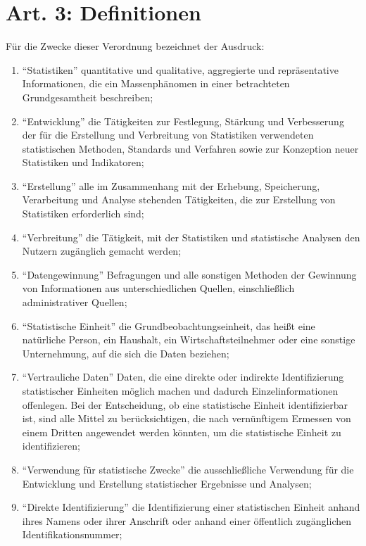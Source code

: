 \documentclass[12pt]{scrbook}
\begin{document}
    \section{Art. 3: Definitionen}
        Für die Zwecke dieser Verordnung bezeichnet der Ausdruck:
        \begin{enumerate}
            \item ``Statistiken'' quantitative und qualitative, aggregierte und repräsentative Informationen, die ein Massenphänomen in einer betrachteten Grundgesamtheit beschreiben;
            \item ``Entwicklung'' die Tätigkeiten zur Festlegung, Stärkung und Verbesserung der für die Erstellung und Verbreitung von Statistiken verwendeten statistischen Methoden, Standards und Verfahren sowie zur Konzeption neuer Statistiken und Indikatoren;
            \item ``Erstellung'' alle im Zusammenhang mit der Erhebung, Speicherung, Verarbeitung und Analyse stehenden Tätigkeiten, die zur Erstellung von Statistiken erforderlich sind;
            \item ``Verbreitung'' die Tätigkeit, mit der Statistiken und statistische Analysen den Nutzern zugänglich gemacht werden;
            \item ``Datengewinnung'' Befragungen und alle sonstigen Methoden der Gewinnung von Informationen aus unterschiedlichen Quellen, einschließlich administrativer Quellen;
            \item ``Statistische Einheit'' die Grundbeobachtungseinheit, das heißt eine natürliche Person, ein Haushalt, ein Wirtschaftsteilnehmer oder eine sonstige Unternehmung, auf die sich die Daten beziehen;
            \item ``Vertrauliche Daten'' Daten, die eine direkte oder indirekte Identifizierung statistischer Einheiten möglich machen und dadurch Einzelinformationen offenlegen. Bei der Entscheidung, ob eine statistische Einheit identifizierbar ist, sind alle Mittel zu berücksichtigen, die nach vernünftigem Ermessen von einem Dritten angewendet werden könnten, um die statistische Einheit zu identifizieren;
            \item ``Verwendung für statistische Zwecke'' die ausschließliche Verwendung für die Entwicklung und Erstellung statistischer Ergebnisse und Analysen;
            \item ``Direkte Identifizierung'' die Identifizierung einer statistischen Einheit anhand ihres Namens oder ihrer Anschrift oder anhand einer öffentlich zugänglichen Identifikationsnummer;

\end{enumerate}
\end{document}
